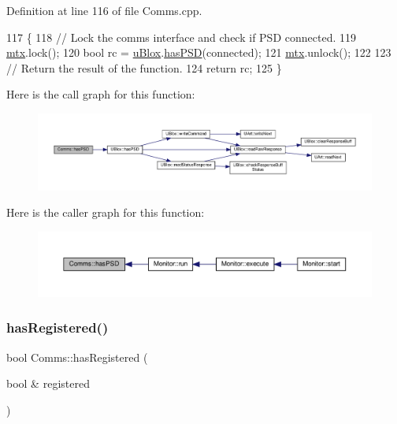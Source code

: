 Definition at line 116 of file Comms.\+cpp.


\begin{DoxyCode}
117 \{
118     \textcolor{comment}{// Lock the comms interface and check if PSD connected.}
119     \hyperlink{class_comms_a21df861b1202573e4cd0cb5666d638fe}{mtx}.lock();
120     \textcolor{keywordtype}{bool} rc = \hyperlink{class_comms_ac64dea134b116147e5441172346dbd6c}{uBlox}.\hyperlink{class_u_blox_ae49b51a602a327b5eff5b04d2ccaec20}{hasPSD}(connected);
121     \hyperlink{class_comms_a21df861b1202573e4cd0cb5666d638fe}{mtx}.unlock();
122 
123     \textcolor{comment}{// Return the result of the function.}
124     \textcolor{keywordflow}{return} rc;
125 \}
\end{DoxyCode}
Here is the call graph for this function\+:\nopagebreak
\begin{figure}[H]
\begin{center}
\leavevmode
\includegraphics[width=350pt]{d8/dcc/class_comms_a2c43ce409b48f4d28eefb7934cdd1523_cgraph}
\end{center}
\end{figure}
Here is the caller graph for this function\+:\nopagebreak
\begin{figure}[H]
\begin{center}
\leavevmode
\includegraphics[width=350pt]{d8/dcc/class_comms_a2c43ce409b48f4d28eefb7934cdd1523_icgraph}
\end{center}
\end{figure}
\mbox{\label{class_comms_ae1fb7ac11bd07f21134335aec55bd833}} 
\subsubsection{\texorpdfstring{has\+Registered()}{hasRegistered()}}
{\footnotesize\ttfamily bool Comms\+::has\+Registered (\begin{DoxyParamCaption}\item[{bool \&}]{registered }\end{DoxyParamCaption})}

